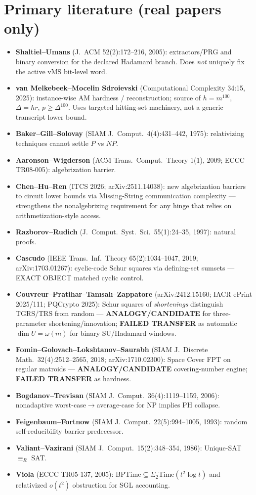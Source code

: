 \documentclass[11pt]{article}
\begin{document}
\section*{Primary literature (real papers only)}
\begin{itemize}
\item \textbf{Shaltiel--Umans} (J.~ACM 52(2):172--216, 2005): extractors/PRG and binary conversion
for the declared Hadamard branch. Does \emph{not} uniquely fix the active vMS bit-level word.
\item \textbf{van Melkebeek--Mocelin Sdroievski} (Computational Complexity 34:15, 2025):
instance-wise AM hardness / reconstruction; source of $h=m^{100}$, $\Delta=hr$, $p\ge\Delta^{100}$.
Uses targeted hitting-set machinery, not a generic transcript lower bound.
\item \textbf{Baker--Gill--Solovay} (SIAM J.\ Comput.\ 4(4):431--442, 1975): relativizing techniques
cannot settle $P$ vs $NP$.
\item \textbf{Aaronson--Wigderson} (ACM Trans.\ Comput.\ Theory 1(1), 2009; ECCC TR08-005):
algebrization barrier.
\item \textbf{Chen--Hu--Ren} (ITCS 2026; arXiv:2511.14038): new algebrization barriers to circuit
lower bounds via Missing-String communication complexity --- strengthens the nonalgebrizing
requirement for any hinge that relies on arithmetization-style access.
\item \textbf{Razborov--Rudich} (J.\ Comput.\ Syst.\ Sci.\ 55(1):24--35, 1997): natural proofs.
\item \textbf{Cascudo} (IEEE Trans.\ Inf.\ Theory 65(2):1034--1047, 2019; arXiv:1703.01267):
cyclic-code Schur squares via defining-set sumsets --- EXACT OBJECT matched cyclic control.
\item \textbf{Couvreur--Pratihar--Tan{\i}sal{\i}--Zappatore} (arXiv:2412.15160; IACR ePrint 2025/111;
PQCrypto 2025): Schur squares of \emph{shortenings} distinguish TGRS/TRS from random ---
\textbf{ANALOGY/CANDIDATE} for three-parameter shortening/innovation;
\textbf{FAILED TRANSFER} as automatic $\dim U=\omega(m)$ for binary SU/Hadamard windows.
\item \textbf{Fomin--Golovach--Lokshtanov--Saurabh} (SIAM J.\ Discrete Math.\ 32(4):2512--2565,
2018; arXiv:1710.02300): Space Cover FPT on regular matroids ---
\textbf{ANALOGY/CANDIDATE} covering-number engine; \textbf{FAILED TRANSFER} as hardness.
\item \textbf{Bogdanov--Trevisan} (SIAM J.\ Comput.\ 36(4):1119--1159, 2006): nonadaptive
worst-case$\to$average-case for NP implies PH collapse.
\item \textbf{Feigenbaum--Fortnow} (SIAM J.\ Comput.\ 22(5):994--1005, 1993): random
self-reducibility barrier predecessor.
\item \textbf{Valiant--Vazirani} (SIAM J.\ Comput.\ 15(2):348--354, 1986): Unique-SAT $\equiv_R$ SAT.
\item \textbf{Viola} (ECCC TR05-137, 2005): BPTime$\subseteq\Sigma_2$Time$(t^2\log t)$ and
relativized $o(t^2)$ obstruction for SGL accounting.
\end{itemize}
\end{document}
